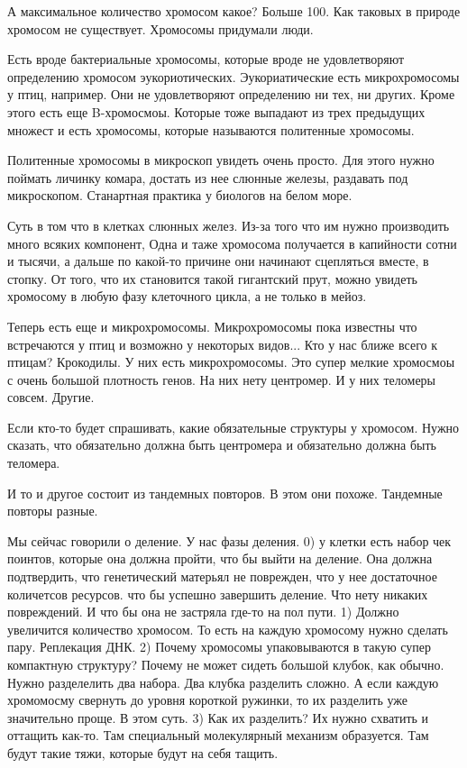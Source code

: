 А максимальное количество хромосом какое? 
Больше 100. Как таковых в природе хромосом не 
существует. Хромосомы придумали люди. 

Есть вроде бактериальные хромосомы, которые вроде не удовлетворяют определению 
хромосом эукориотических. Эукориатические есть микрохромосомы у птиц, 
например. Они не удовлетворяют 
определению ни тех, ни других. Кроме этого есть 
еще B-хромосмоы. Которые тоже выпадают из трех предыдущих 
множест и есть хромосомы, которые называются политенные хромосомы. 

Политенные хромосомы в микроскоп увидеть очень просто. Для этого 
нужно поймать личинку комара, достать из нее слюнные железы, 
раздавать под микроскопом. Станартная практика у биологов на белом море. 

Суть в том что в клетках слюнных желез. Из-за
того что им нужно производить много всяких компонент, 
Одна и таже хромосома получается в капийности 
сотни и тысячи, а дальше по какой-то причине они 
начинают сцепляться вместе, в стопку. От того, что 
их становится такой гигантский прут, можно увидеть 
хромосому в любую фазу клеточного цикла, 
а не только в мейоз.

Теперь есть еще и микрохромосомы. Микрохромосомы пока известны что встречаются 
у птиц и возможно у некоторых видов... Кто у нас ближе всего к птицам? 
Крокодилы. У них есть микрохромосомы. Это супер мелкие хромосмоы 
с очень большой плотность генов. На них нету центромер. И у них 
теломеры совсем. Другие. 

Если кто-то будет спрашивать, какие обязательные структуры у хромосом. Нужно 
сказать, что обязательно должна быть центромера и обязательно 
должна быть теломера. 

И то и другое состоит из тандемных повторов. В этом 
они похоже. Тандемные повторы разные. 

Мы сейчас говорили о деление. У нас фазы деления. 
0) у клетки есть набор чек поинтов,
которые она должна пройти, что бы выйти на деление.
Она должна подтвердить, что
генетический матерьял не поврежден,
что у нее достаточное количетсов ресурсов.
что бы успешно завершить деление. Что
нету никаких повреждений. И что бы она не застряла где-то на
пол пути.
1) Должно увеличится количество хромосом. То есть на
каждую хромосому нужно сделать пару. Реплекация ДНК.
2) Почему хромосомы упаковываются в такую супер компактную структуру?
Почему не может сидеть большой клубок, как обычно.
Нужно разделелить два набора. Два клубка
разделить сложно. А если каждую хромомосму свернуть
до уровня короткой ружинки, то
их разделить уже значительно проще.
В этом суть.
3) Как их разделить? Их нужно схватить и оттащить
как-то. Там специальный молекулярный механизм образуется.
Там будут такие тяжи, которые будут на себя тащить.

